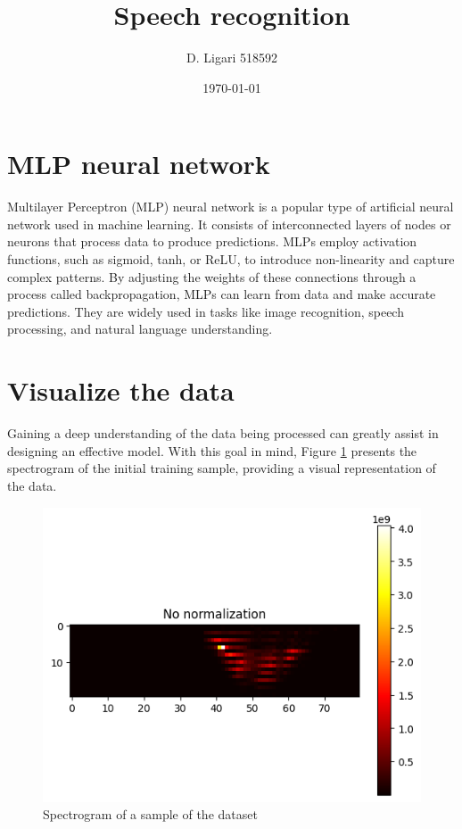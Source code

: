 \documentclass{class}
\title{Speech recognition}
\author[1]{D. Ligari 518592}
\affil[1]{Machine Learning course, University of Pavia, Department of Computer Engineering (Data Science), Pavia, Italy}
\date{\today}
\begin{document}
\maketitle
\thispagestyle{FirstPage}
\section{MLP neural network}
Multilayer Perceptron (MLP) neural network is a popular type of artificial neural network used in machine learning.
It consists of interconnected layers of nodes or neurons that process data to produce predictions.
MLPs employ activation functions, such as sigmoid, tanh, or ReLU, to introduce non-linearity and capture complex patterns.
By adjusting the weights of these connections through a process called backpropagation, MLPs can learn from data and make accurate predictions.
They are widely used in tasks like image recognition, speech processing, and natural language understanding.

\section{Visualize the data}
Gaining a deep understanding of the data being processed can greatly assist in designing an effective model.
With this goal in mind, Figure \ref{fig-1} presents the spectrogram of the initial training sample, providing a visual representation of the data.

\begin{figure}[H]
  \centering
  \includegraphics[width=.6\columnwidth]{images/sample_spectrogram.png}
  \caption{Spectrogram of a sample of the dataset}
  \label{fig-1}
\end{figure}
\end{document}
